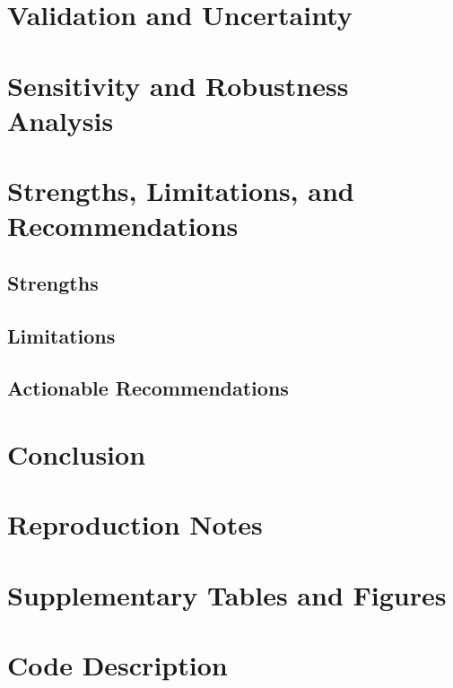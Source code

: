 \documentclass[11pt,letterpaper]{article}
\begin{document}

\section{Validation and Uncertainty}

\section{Sensitivity and Robustness Analysis}

\section{Strengths, Limitations, and Recommendations}
\subsection{Strengths}
\subsection{Limitations}
\subsection{Actionable Recommendations}

\section{Conclusion}

\nocite{example_reference}




\appendix
\section{Reproduction Notes}
\section{Supplementary Tables and Figures}
\section{Code Description}
\end{document}
